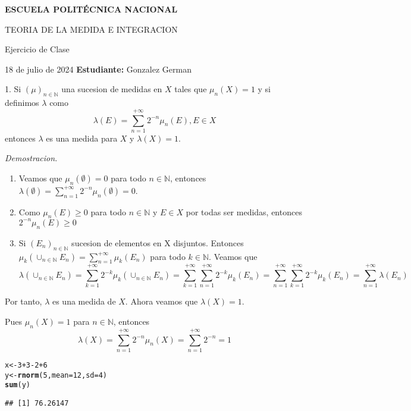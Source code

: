 \documentclass{article}\usepackage[]{graphicx}\usepackage[]{xcolor}
\makeatletter
\newcommand{\hlnum}[1]{\textcolor[rgb]{0.686,0.059,0.569}{#1}}%
\newcommand{\hlopt}[1]{\textcolor[rgb]{0,0,0}{#1}}%
\newcommand{\hldef}[1]{\textcolor[rgb]{0.345,0.345,0.345}{#1}}%
\newcommand{\hlkwb}[1]{\textcolor[rgb]{0.69,0.353,0.396}{#1}}%
\newcommand{\hlkwc}[1]{\textcolor[rgb]{0.333,0.667,0.333}{#1}}%
\newcommand{\hlkwd}[1]{\textcolor[rgb]{0.737,0.353,0.396}{\textbf{#1}}}%
\newenvironment{kframe}{%
 \def\at@end@of@kframe{}%
 \ifinner\ifhmode%
  \def\at@end@of@kframe{\end{minipage}}%
  \begin{minipage}{\columnwidth}%
 \fi\fi%
 \def\FrameCommand##1{\hskip\@totalleftmargin \hskip-\fboxsep
 \colorbox{shadecolor}{##1}\hskip-\fboxsep
     \hskip-\linewidth \hskip-\@totalleftmargin \hskip\columnwidth}%
 \MakeFramed {\advance\hsize-\width
   \@totalleftmargin\z@ \linewidth\hsize
   \@setminipage}}%
 {\par\unskip\endMakeFramed%
 \at@end@of@kframe}
\newenvironment{knitrout}{}{} %
\makeatother
\begin{document}
\hrulefill

\begin{center}
\textbf{ESCUELA POLITÉCNICA NACIONAL}

TEORIA DE LA MEDIDA E INTEGRACION
\end{center}
\begin{center}
    Ejercicio de Clase
\end{center}

18 de julio de 2024 \hfill \textbf{Estudiante:} Gonzalez German

\hrulefill

1. Si $(\mu)_{n \in \mathbb{N}}$ una sucesion de medidas en $X$ tales que $\mu_n(X)=1$ y si definimos $\lambda$ como $$\lambda(E)=\sum_{n=1}^{+\infty} 2^{-n} \mu_{n}(E) , E \in X$$
entonces $\lambda$ es una medida para $X$ y $\lambda(X)=1$.

\textit{Demostracion.} 
\begin{enumerate}
    \item Veamos que $\mu_n(\emptyset)=0$ para todo $n \in \mathbb{N}$, entonces $\lambda(\emptyset)=\sum_{n=1}^{+\infty} 2^{-n} \mu_{n}(\emptyset)=0$.
    \item Como $\mu_n(E) \geq 0$ para todo $n \in \mathbb{N}$ y $E \in X$ por todas ser medidas, entonces $2^{-n} \mu_n(E) \geq 0$
    \item Si $(E_n)_{n \in \mathbb{N}}$ sucesion de elementos en X disjuntos. Entonces $\mu_k (\cup_{n \in \mathbb{N}} E_n) = \sum_{n=1}^{+\infty} \mu_k (E_n)$ para todo $k\in \mathbb{N}$.
    Veamos que $$\lambda(\cup_{n \in \mathbb{N}} E_n)= \sum_{k=1}^{+\infty} 2^{-k} \mu_k (\cup_{n \in \mathbb{N}} E_n)=\sum_{k=1}^{+\infty} \sum_{n=1}^{+\infty} 2^{-k} \mu_k (E_n)=\sum_{n=1}^{+\infty} \sum_{k=1}^{+\infty}  2^{-k} \mu_k (E_n)= \sum_{n=1}^{+\infty} \lambda(E_n)$$
    
\end{enumerate}

Por tanto, $\lambda$ es una medida de $X$. Ahora veamos que $\lambda(X)=1$.

Pues $\mu_n(X)=1$ para $n\in \mathbb{N}$, entonces $$\lambda(X)=\sum_{n=1}^{+\infty} 2^{-n} \mu_n(X)= \sum_{n=1}^{+\infty} 2^{-n} =1$$ 

\begin{knitrout}
\color{fgcolor}\begin{kframe}
\begin{alltt}
\hldef{x} \hlkwb{<-} \hlnum{3}\hlopt{+}\hlnum{3}\hlopt{-}\hlnum{2}\hlopt{+}\hlnum{6}
\hldef{y} \hlkwb{<-} \hlkwd{rnorm}\hldef{(}\hlnum{5}\hldef{,}\hlkwc{mean}\hldef{=}\hlnum{12}\hldef{,}\hlkwc{sd}\hldef{=}\hlnum{4}\hldef{)}
\hlkwd{sum}\hldef{(y)}
\end{alltt}
\begin{verbatim}
## [1] 76.26147
\end{verbatim}
\end{kframe}
\end{knitrout}
\end{document}
